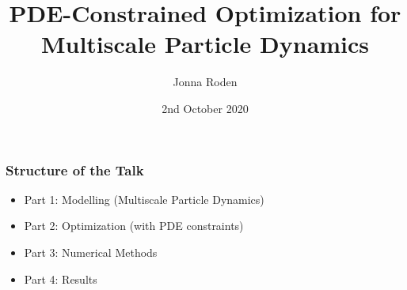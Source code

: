 \documentclass[aspectratio=169,xcolor=dvipsnames]{beamer}
\begin{document}
\title[]{PDE-Constrained Optimization for Multiscale Particle Dynamics}
\author[Jonna Roden]{Jonna Roden}
\date{2nd October 2020}

\begin{frame}
\titlepage
\end{frame}
 
 
\begin{frame}
	\frametitle{Structure of the Talk}
	 
	 \begin{itemize}
	 	\item Part 1: Modelling (Multiscale Particle Dynamics)
	 	\item Part 2: Optimization (with PDE constraints)
	 	\item Part 3: Numerical Methods 
	 	\item Part 4: Results
	 \end{itemize}
\end{frame}
\end{document}
